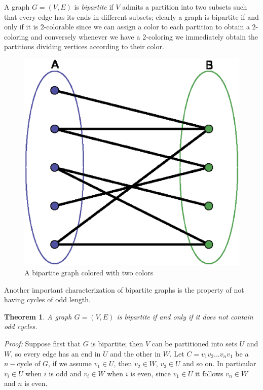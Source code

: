 \documentclass[a4paper,12pt,oneside]{book}
\newtheorem{theorem}{Theorem}[chapter]
\begin{document}
A graph $G=(V,E)$ is \textit{bipartite} if $V$ admits a partition into two subsets such that every edge has its ends in different subsets; clearly a graph is bipartite if and only if it is 2-colorable since we can assign a color to each partition to obtain a 2-coloring and conversely whenever we have a 2-coloring we immediately obtain the partitions dividing vertices according to their color. 
\begin{figure} 
\begin{center}
\includegraphics[scale=0.28]{bipartite.eps}
\caption{A bipartite graph colored with two colors}\label{bip}
\end{center}
\end{figure}

\newpage
Another important characterization of bipartite graphs is the property of not having cycles of odd length.
\begin{theorem}
A graph $G=(V,E)$ is bipartite if and only if it does not contain odd cycles.
\end{theorem}
\textit{Proof:}
Suppose first that $G$ is bipartite; then $V$ can be partitioned into sets $U$ and $W$, so every edge has an end in $U$ and the other in $W$. Let $C=v_1v_2...v_nv_1$ be a $n-$cycle of $G$, if we assume $v_1\in U$, then $v_2\in W$, $v_3\in U$ and so on.
In particular $v_i\in U $ when $i$ is odd and $v_i\in W$ when $i$ is even, since $v_1\in U$ it follows $v_n\in W$ and $n$ is even.
\end{document}
